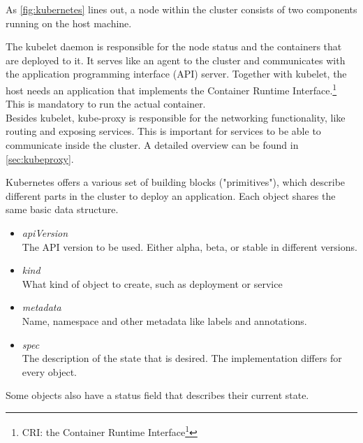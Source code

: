As \autoref{fig:kubernetes} lines out, a node within the cluster consists of two components running on the host machine.

The kubelet daemon is responsible for the node status and the containers that are deployed to it.
It serves like an agent to the cluster and communicates with the application programming interface (API) server.
Together with kubelet, the host needs an application that implements the Container Runtime Interface.\footnote{CRI: the Container Runtime Interface\footcite{CRI}}
This is mandatory to run the actual container.
\\
Besides kubelet, kube-proxy is responsible for the networking functionality, like routing and exposing services.
This is important for services to be able to communicate inside the cluster.
A detailed overview can be found in \autoref{sec:kubeproxy}.\cite{KUBERNETES-COMPONENTS}
\\
\newpage

Kubernetes offers a various set of building blocks ("primitives"), which describe different parts in the cluster to deploy an application.
Each object shares the same basic data structure.

\begin{itemize}
    \item \textit{apiVersion} \\
    The API version to be used.
    Either alpha, beta, or stable in different versions.
    \item \textit{kind} \\
    What kind of object to create, such as deployment or service
    \item \textit{metadata} \\
    Name, namespace and other metadata like labels and annotations.
    \item \textit{spec} \\
    The description of the state that is desired.
    The implementation differs for every object.
\end{itemize}

Some objects also have a status field that describes their current state.~\cite{KUBERNETES-OBJECTS}

